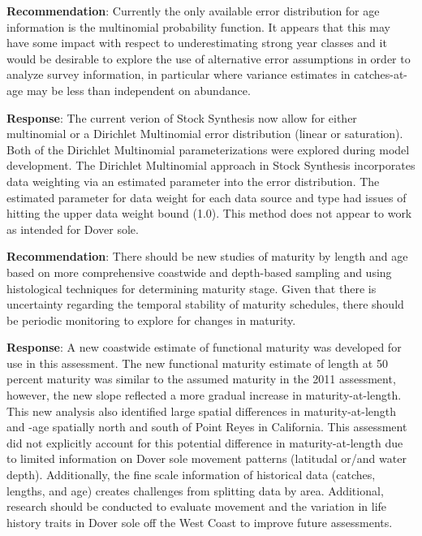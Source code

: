 \documentclass[11pt,
  english,
  a4paper,
]{article}
\begin{document}
\textbf{Recommendation}: Currently the only available error distribution for age information is the multinomial probability function. It appears that this may have some impact with respect to underestimating strong year classes and it would be desirable to explore the use of alternative error assumptions in order to analyze survey information, in particular where variance estimates in catches-at-age may be less than independent on abundance.

\leavevmode\tagmcend\tagstructend\par


\textbf{Response}: The current verion of Stock Synthesis now allow for either multinomial or a Dirichlet Multinomial error distribution (linear or saturation). Both of the Dirichlet Multinomial parameterizations were explored during model development. The Dirichlet Multinomial approach in Stock Synthesis incorporates data weighting via an estimated parameter into the error distribution. The estimated parameter for data weight for each data source and type had issues of hitting the upper data weight bound (1.0). This method does not appear to work as intended for Dover sole.

\leavevmode\tagmcend\tagstructend\par


\textbf{Recommendation}: There should be new studies of maturity by length and age based on more comprehensive coastwide and depth-based sampling and using histological techniques for determining maturity stage. Given that there is uncertainty regarding the temporal stability of maturity schedules, there should be periodic monitoring to explore for changes in maturity.

\leavevmode\tagmcend\tagstructend\par


\textbf{Response}: A new coastwide estimate of functional maturity was developed for use in this assessment. The new functional maturity estimate of length at 50 percent maturity was similar to the assumed maturity in the 2011 assessment, however, the new slope reflected a more gradual increase in maturity-at-length. This new analysis also identified large spatial differences in maturity-at-length and -age spatially north and south of Point Reyes in California. This assessment did not explicitly account for this potential difference in maturity-at-length due to limited information on Dover sole movement patterns (latitudal or/and water depth). Additionally, the fine scale information of historical data (catches, lengths, and age) creates challenges from splitting data by area. Additional, research should be conducted to evaluate movement and the variation in life history traits in Dover sole off the West Coast to improve future assessments.
\end{document}
